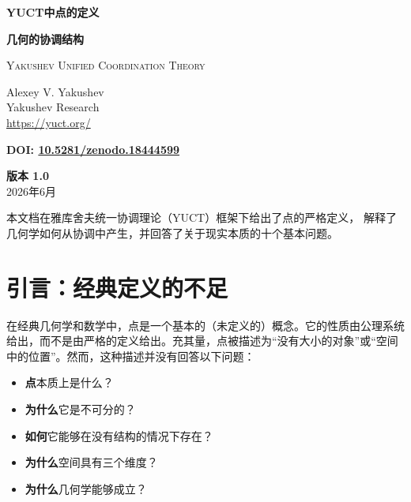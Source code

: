\documentclass[12pt,a4paper]{article}
\begin{document}
	
	\begin{titlepage}
		\begin{center}
			\vspace*{1.5cm}
			\Huge\textbf{YUCT中点的定义}
			
			\vspace{0.3cm}
			\Large\textbf{几何的协调结构}
			
			\vspace{0.5cm}
			\large
			\textsc{Yakushev Unified Coordination Theory}
			
			\vspace{0.8cm}
			\large
			Alexey V. Yakushev \\
			Yakushev Research \\
			\url{https://yuct.org/}
			
			\vspace{0.5cm}
			\large
			\textbf{DOI: \href{https://doi.org/10.5281/zenodo.18444599}{10.5281/zenodo.18444599}}
			
			\vspace{1.5cm}
			\large
			\textbf{版本 1.0} \\
			2026年6月
			
			\vfill
			\normalsize
			本文档在雅库舍夫统一协调理论（YUCT）框架下给出了点的严格定义，
			解释了几何学如何从协调中产生，并回答了关于现实本质的十个基本问题。
		\end{center}
	\end{titlepage}
	
	\tableofcontents
	\newpage
	
	\section{引言：经典定义的不足}
	
	在经典几何学和数学中，点是一个基本的（未定义的）概念。它的性质由公理系统给出，而不是由严格的定义给出。充其量，点被描述为“没有大小的对象”或“空间中的位置”。然而，这种描述并没有回答以下问题：
	
	\begin{itemize}
		\item \textbf{点}本质上是什么？
		\item \textbf{为什么}它是不可分的？
		\item \textbf{如何}它能够在没有结构的情况下存在？
		\item \textbf{为什么}空间具有三个维度？
		\item \textbf{为什么}几何学能够成立？
	\end{itemize}
	
\end{document}
